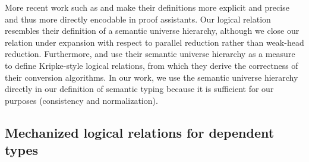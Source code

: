 \documentclass[acmsmall,screen=true,
\ifpublic review=false\else,review=true\fi
  ,anonymous=\ifanonymous true\else false\fi]{acmart}
\newcommand{\scw}[1]{}
\newcommand{\yl}[1]{}
\begin{document}
More recent work such as \citet{Abel12}
and \citet{abel2008betaeta} make their definitions more explicit and
precise and thus more directly encodable in proof assistants.
Our logical relation resembles their definition of a
semantic universe hierarchy, although we close our relation
under expansion with respect to parallel reduction rather
than weak-head reduction. \scw{Why is this important?} \yl{if you are
  referring to the sentence about weak-head reduction, it can
  be deleted because it's discussed in Section 9 already}
Furthermore, \citet{Abel12} and
\citet{abel2008betaeta} use their semantic universe hierarchy as a
measure to define Kripke-style logical relations, from which they
derive the correctness of their conversion algorithms. In our work, we
use the semantic universe hierarchy directly in our definition of
semantic typing because it is sufficient for our purposes
(consistency and normalization).

\subsection{Mechanized logical relations for dependent types}

\newcommand\header[1]{\rotatebox{0}{{#1}}}
\end{document}
